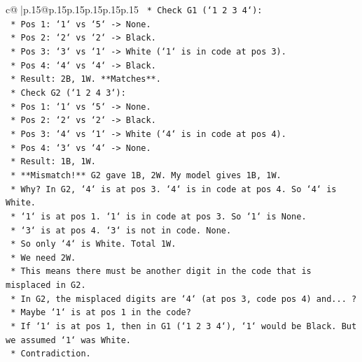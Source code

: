 \documentclass{article}
\begin{document}
{\begin{supertabular}{c@{$\;$}|p{.15\linewidth}@{}p{.15\linewidth}p{.15\linewidth}p{.15\linewidth}p{.15\linewidth}p{.15\linewidth}}
{{{\texttt{            *   Check G1 (`1 2 3 4`):} \\
\texttt{                *   Pos 1: `1` vs `5` {-}> None.} \\
\texttt{                *   Pos 2: `2` vs `2` {-}> Black.} \\
\texttt{                *   Pos 3: `3` vs `1` {-}> White (`1` is in code at pos 3).} \\
\texttt{                *   Pos 4: `4` vs `4` {-}> Black.} \\
\texttt{                *   Result: 2B, 1W. **Matches**.} \\
\texttt{            *   Check G2 (`1 2 4 3`):} \\
\texttt{                *   Pos 1: `1` vs `5` {-}> None.} \\
\texttt{                *   Pos 2: `2` vs `2` {-}> Black.} \\
\texttt{                *   Pos 3: `4` vs `1` {-}> White (`4` is in code at pos 4).} \\
\texttt{                *   Pos 4: `3` vs `4` {-}> None.} \\
\texttt{                *   Result: 1B, 1W.} \\
\texttt{                *   **Mismatch!** G2 gave 1B, 2W. My model gives 1B, 1W.} \\
\texttt{                *   Why? In G2, `4` is at pos 3. `4` is in code at pos 4. So `4` is White.} \\
\texttt{                *   `1` is at pos 1. `1` is in code at pos 3. So `1` is None.} \\
\texttt{                *   `3` is at pos 4. `3` is not in code. None.} \\
\texttt{                *   So only `4` is White. Total 1W.} \\
\texttt{                *   We need 2W.} \\
\texttt{                *   This means there must be another digit in the code that is misplaced in G2.} \\
\texttt{                *   In G2, the misplaced digits are `4` (at pos 3, code pos 4) and... ?} \\
\texttt{                *   Maybe `1` is at pos 1 in the code?} \\
\texttt{                *   If `1` is at pos 1, then in G1 (`1 2 3 4`), `1` would be Black. But we assumed `1` was White.} \\
\texttt{                *   Contradiction.} \\
\\ 
}}}
\end{supertabular}}
\end{document}
